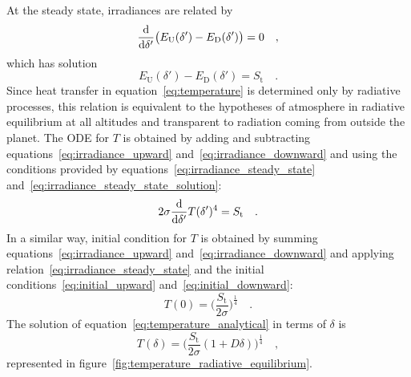 \documentclass[a4paper,10pt,twocolumn,\classoptions]{article}
\begin{document}
At the steady state, irradiances are related by
\begin{equation}
  \label{eq:irradiance_steady_state}
  \odv*{\big( E_\text{U}(\delta') - E_\text{D}(\delta') \big)}{\delta'} = 0
  \quad ,
\end{equation}
which has solution
\begin{equation}
  \label{eq:irradiance_steady_state_solution}
  E_\text{U}(\delta') - E_\text{D}(\delta') = S_\text{t}
  \quad .
\end{equation}
Since heat transfer in equation~\eqref{eq:temperature} is determined only by radiative processes, this relation is equivalent to the hypotheses of atmosphere in radiative equilibrium at all altitudes and transparent to radiation coming from outside the planet.
The ODE for $T$ is obtained by adding and subtracting equations~\eqref{eq:irradiance_upward} and~\eqref{eq:irradiance_downward} and using the conditions provided by equations~\eqref{eq:irradiance_steady_state} and~\eqref{eq:irradiance_steady_state_solution}:
\begin{equation}
  \label{eq:temperature_analytical}
  2 \sigma \odv*{T(\delta')^4}{\delta'} = S_\text{t}
  \quad .
\end{equation}
In a similar way, initial condition for $T$ is obtained by summing equations~\eqref{eq:irradiance_upward} and~\eqref{eq:irradiance_downward} and applying relation~\eqref{eq:irradiance_steady_state} and the initial conditions~\eqref{eq:initial_upward} and~\eqref{eq:initial_downward}:
\begin{equation}
  \label{eq:initial_temperature}
  T(0) = \bigg( \frac{S_\text{t}}{2 \sigma} \bigg)^\frac{1}{4}
  \quad .
\end{equation}
The solution of equation~\eqref{eq:temperature_analytical} in terms of $\delta$ is
\begin{equation}
  \label{eq:temperature_analytical_solution}
  T(\delta) = \bigg( \frac{S_\text{t}}{2 \sigma} (1 + D \delta) \bigg)^\frac{1}{4}
  \quad ,
\end{equation}
represented in figure~\ref{fig:temperature_radiative_equilibrium}.
\end{document}
